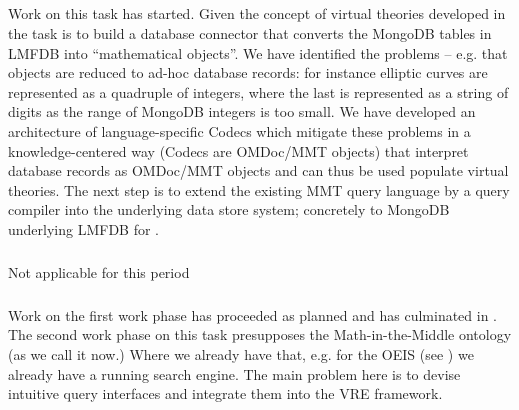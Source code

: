 \subparagraph{}

Work on this task has started. Given the concept of virtual theories developed in  the task is to build a database connector that converts the MongoDB tables in LMFDB into ``mathematical objects''.
We have identified the problems -- e.g. that objects are reduced to ad-hoc database records: for instance elliptic curves are represented as a quadruple of integers, where the last is represented as a string of digits as the range of MongoDB integers is too small.
We have developed an architecture of language-specific Codecs which mitigate these problems in a knowledge-centered way (Codecs are OMDoc/MMT objects) that interpret database records as OMDoc/MMT objects and can thus be used populate virtual theories.
The next step is to extend the existing MMT query language by a query compiler into the underlying data store system; concretely to MongoDB underlying LMFDB for .
\medskip

\subparagraph{}
Not applicable for this period
\medskip

\subparagraph{}

Work on the first work phase has proceeded as planned and has culminated in .
The second work phase on this task presupposes the Math-in-the-Middle ontology (as we call it now.)
Where we already have that, e.g. for the OEIS (see ) we already have a running search engine.
The main problem here is to devise intuitive query interfaces and integrate them into the \pn VRE framework.


